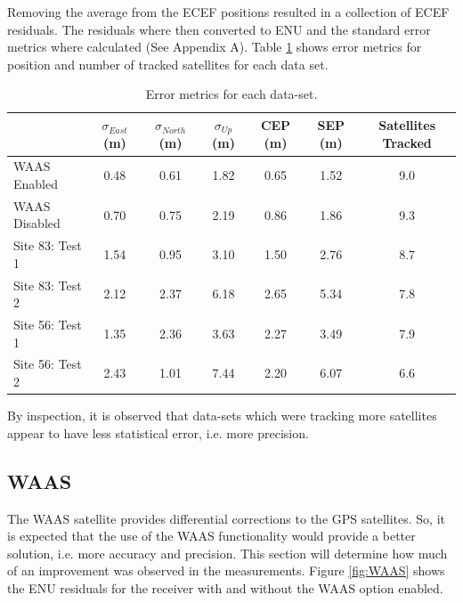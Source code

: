\documentclass[11pt]{article}
\begin{document}
Removing the average from the ECEF positions resulted in a collection of ECEF residuals. The residuals where then converted to ENU and the standard error metrics where calculated (See Appendix A). Table \ref{tab:stats} shows error metrics for position and number of tracked satellites for each data set.
\\
\begin{table}[h!]
\begin{center}
    \begin{tabular}{  l || c | c | c | c | c | c | }
  & $\sigma_{East}$ (m) & $\sigma_{North}$ (m) & $\sigma_{Up}$ (m) & CEP (m) & SEP (m) & Satellites Tracked \\\hline
  \hline
WAAS Enabled    &  0.48  & 0.61 &  1.82 & 0.65 & 1.52 & 9.0 \\\hline
WAAS Disabled   &  0.70  & 0.75 &  2.19 & 0.86 & 1.86 & 9.3 \\\hline
Site 83: Test 1 &  1.54  & 0.95 &  3.10 & 1.50 & 2.76 & 8.7 \\\hline
Site 83: Test 2 &  2.12  & 2.37 &  6.18 & 2.65 & 5.34 & 7.8 \\\hline
Site 56: Test 1 &  1.35  & 2.36 &  3.63 & 2.27 & 3.49 & 7.9 \\\hline
Site 56: Test 2 &  2.43  & 1.01 &  7.44 & 2.20 & 6.07 & 6.6 \\\hline
    \end{tabular}
\caption{Error metrics for each data-set.}
\label{tab:stats}
\end{center}
\end{table}

By inspection, it is observed that data-sets which were tracking more satellites appear to have less statistical error, i.e. more precision.



\subsection{WAAS}

The WAAS satellite provides differential corrections to the GPS satellites. So, it is expected that the use of the WAAS functionality would provide a better solution, i.e. more accuracy and precision. This section will determine how much of an improvement was observed in the measurements. Figure \ref{fig:WAAS} shows the ENU residuals for the receiver with and without the WAAS option enabled.
\end{document}
